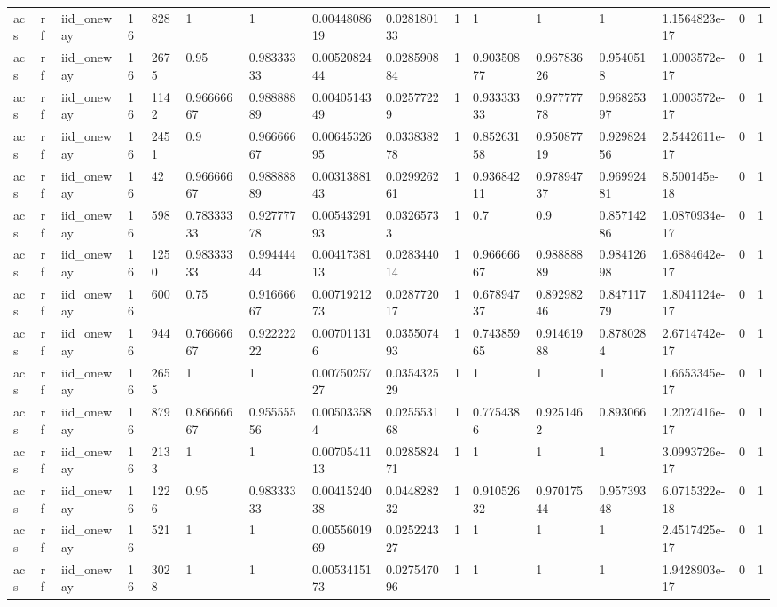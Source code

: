 \begin{tabular}{llllllllllllllll}
acs & rf & iid\_oneway & 16 & 828 & 1 & 1 & 0.0044808619 & 0.028180133 & 1 & 1 & 1 & 1 & 1.1564823e-17 & 0 & 1 \\
acs & rf & iid\_oneway & 16 & 2675 & 0.95 & 0.98333333 & 0.0052082444 & 0.028590884 & 1 & 0.90350877 & 0.96783626 & 0.9540518 & 1.0003572e-17 & 0 & 1 \\
acs & rf & iid\_oneway & 16 & 1142 & 0.96666667 & 0.98888889 & 0.0040514349 & 0.02577229 & 1 & 0.93333333 & 0.97777778 & 0.96825397 & 1.0003572e-17 & 0 & 1 \\
acs & rf & iid\_oneway & 16 & 2451 & 0.9 & 0.96666667 & 0.0064532695 & 0.033838278 & 1 & 0.85263158 & 0.95087719 & 0.92982456 & 2.5442611e-17 & 0 & 1 \\
acs & rf & iid\_oneway & 16 & 42 & 0.96666667 & 0.98888889 & 0.0031388143 & 0.029926261 & 1 & 0.93684211 & 0.97894737 & 0.96992481 & 8.500145e-18 & 0 & 1 \\
acs & rf & iid\_oneway & 16 & 598 & 0.78333333 & 0.92777778 & 0.0054329193 & 0.03265733 & 1 & 0.7 & 0.9 & 0.85714286 & 1.0870934e-17 & 0 & 1 \\
acs & rf & iid\_oneway & 16 & 1250 & 0.98333333 & 0.99444444 & 0.0041738113 & 0.028344014 & 1 & 0.96666667 & 0.98888889 & 0.98412698 & 1.6884642e-17 & 0 & 1 \\
acs & rf & iid\_oneway & 16 & 600 & 0.75 & 0.91666667 & 0.0071921273 & 0.028772017 & 1 & 0.67894737 & 0.89298246 & 0.84711779 & 1.8041124e-17 & 0 & 1 \\
acs & rf & iid\_oneway & 16 & 944 & 0.76666667 & 0.92222222 & 0.007011316 & 0.035507493 & 1 & 0.74385965 & 0.91461988 & 0.8780284 & 2.6714742e-17 & 0 & 1 \\
acs & rf & iid\_oneway & 16 & 2655 & 1 & 1 & 0.0075025727 & 0.035432529 & 1 & 1 & 1 & 1 & 1.6653345e-17 & 0 & 1 \\
acs & rf & iid\_oneway & 16 & 879 & 0.86666667 & 0.95555556 & 0.005033584 & 0.025553168 & 1 & 0.7754386 & 0.9251462 & 0.893066 & 1.2027416e-17 & 0 & 1 \\
acs & rf & iid\_oneway & 16 & 2133 & 1 & 1 & 0.0070541113 & 0.028582471 & 1 & 1 & 1 & 1 & 3.0993726e-17 & 0 & 1 \\
acs & rf & iid\_oneway & 16 & 1226 & 0.95 & 0.98333333 & 0.0041524038 & 0.044828232 & 1 & 0.91052632 & 0.97017544 & 0.95739348 & 6.0715322e-18 & 0 & 1 \\
acs & rf & iid\_oneway & 16 & 521 & 1 & 1 & 0.0055601969 & 0.025224327 & 1 & 1 & 1 & 1 & 2.4517425e-17 & 0 & 1 \\
acs & rf & iid\_oneway & 16 & 3028 & 1 & 1 & 0.0053415173 & 0.027547096 & 1 & 1 & 1 & 1 & 1.9428903e-17 & 0 & 1 \\

\end{tabular}
